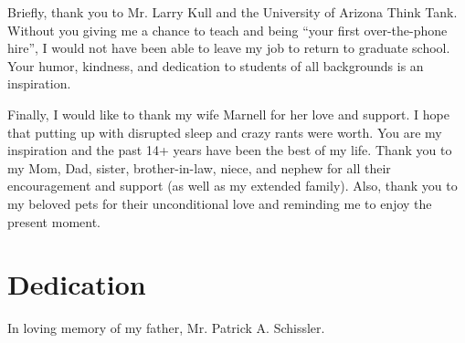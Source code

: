 \documentclass[final]{ua-thesis}
\numberwithin{equation}{section}
\begin{document}
Briefly, thank you to Mr. Larry Kull and the University of Arizona Think Tank. Without you giving me a chance to teach and being ``your first over-the-phone hire'', I would not have been able to leave my job to return to graduate school. Your humor, kindness, and dedication to students of all backgrounds is an inspiration.

Finally, I would like to thank my wife Marnell for her love and support. I hope that putting up with disrupted sleep and crazy rants were worth. You are my inspiration and the past 14+ years have been the best of my life. Thank you to my Mom, Dad, sister, brother-in-law, niece, and nephew for all their encouragement and support (as well as my extended family). Also, thank you to my beloved pets for their unconditional love and reminding me to enjoy the present moment.

\chapter*{Dedication}
\thispagestyle{topright}
\begin{center}In loving memory of my father, Mr. Patrick A. Schissler.\end{center}


\tableofcontents

\listoffigures
\listoftables
\end{document}
